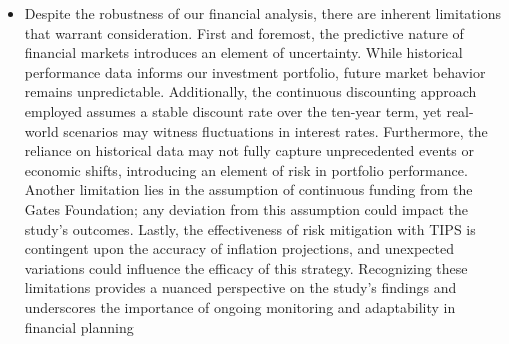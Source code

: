 \documentclass[10pt,twocolumn,twoside,final]{IEEEtran}
\begin{document}
{{\begin{itemize}
{}
\item{Despite the robustness of our financial analysis, there are inherent limitations that warrant consideration. First and foremost, the predictive nature of financial markets introduces an element of uncertainty. While historical performance data informs our investment portfolio, future market behavior remains unpredictable. Additionally, the continuous discounting approach employed assumes a stable discount rate over the ten-year term, yet real-world scenarios may witness fluctuations in interest rates. Furthermore, the reliance on historical data may not fully capture unprecedented events or economic shifts, introducing an element of risk in portfolio performance. Another limitation lies in the assumption of continuous funding from the Gates Foundation; any deviation from this assumption could impact the study's outcomes. Lastly, the effectiveness of risk mitigation with TIPS is contingent upon the accuracy of inflation projections, and unexpected variations could influence the efficacy of this strategy. Recognizing these limitations provides a nuanced perspective on the study's findings and underscores the importance of ongoing monitoring and adaptability in financial planning}
\end{itemize}

}}
\end{document}
